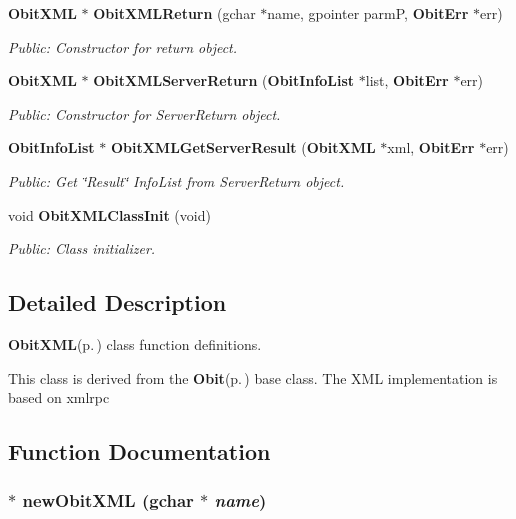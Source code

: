 \begin{CompactItemize}
{\bf Obit\-XML} $\ast$ {\bf Obit\-XMLReturn} (gchar $\ast$name, gpointer parm\-P, {\bf Obit\-Err} $\ast$err)
\begin{CompactList}\small\item\em Public: Constructor for return object. \item\end{CompactList}\item 
{\bf Obit\-XML} $\ast$ {\bf Obit\-XMLServer\-Return} ({\bf Obit\-Info\-List} $\ast$list, {\bf Obit\-Err} $\ast$err)
\begin{CompactList}\small\item\em Public: Constructor for Server\-Return object. \item\end{CompactList}\item 
{\bf Obit\-Info\-List} $\ast$ {\bf Obit\-XMLGet\-Server\-Result} ({\bf Obit\-XML} $\ast$xml, {\bf Obit\-Err} $\ast$err)
\begin{CompactList}\small\item\em Public: Get \char`\"{}Result\char`\"{} Info\-List from Server\-Return object. \item\end{CompactList}\item 
void {\bf Obit\-XMLClass\-Init} (void)
\begin{CompactList}\small\item\em Public: Class initializer. \item\end{CompactList}\end{CompactItemize}


\subsection{Detailed Description}
{\bf Obit\-XML}{\rm (p.\,\pageref{structObitXML})} class function definitions. 

This class is derived from the {\bf Obit}{\rm (p.\,\pageref{structObit})} base class. The XML implementation is based on xmlrpc

\subsection{Function Documentation}
\subsubsection{$\ast$ new\-Obit\-XML (gchar $\ast$ {\em name})}\label{ObitXML_8c_a8}



